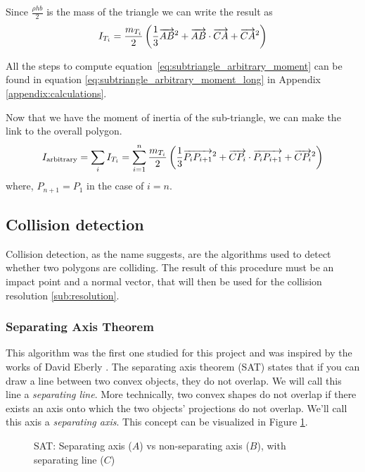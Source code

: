 Since $\frac{\rho h b}{2}$ is the mass of the triangle we can write the result
as
\begin{equation}
	I_{T_i} = \frac{m_{T_i}}{2} \left(\frac{1}{3} \overrightarrow{AB}^2 + \overrightarrow{AB} \cdot \overrightarrow{CA}
	+ \overrightarrow{CA}^2\right)
\end{equation}


All the steps to compute equation~\ref{eq:subtriangle_arbitrary_moment} can be
found in equation \ref{eq:subtriangle_arbitrary_moment_long} in Appendix
\ref{appendix:calculations}.

Now that we have the moment of inertia of the sub-triangle, we can make the link
to the overall polygon.
\begin{equation}
	I_{\text{arbitrary}} = \sum_i I_{T_i} = \sum_{i=1}^n \frac{m_{T_i}}{2}
	\left(\frac{1}{3} \overrightarrow{P_iP_{i+1}}^2 + \overrightarrow{CP_i} \cdot \overrightarrow{P_iP_{i+1}} +
	\overrightarrow{CP_i}^2\right)
\end{equation}
where, $P_{n+1} = P_1$ in the case of $i = n$.

\subsection{Collision detection}
\label{sub:collision-detection}

Collision detection, as the name suggests, are the algorithms used to detect
whether two polygons are colliding. The result of this procedure must be an
impact point and a normal vector, that will then be used for the  collision
resolution \ref{sub:resolution}.

\subsubsection{Separating Axis Theorem}

This algorithm was the first one studied for this project and was inspired by
the works of David Eberly \cite{convexcollisionsSAT}. The separating axis
theorem (SAT) states that if you can draw a line between two convex objects,
they do not overlap. We will call this line a \textit{separating line}. More
technically, two convex shapes do not overlap if there exists an axis onto which
the two objects' projections do not overlap. We'll call this axis a \textit{separating
	axis}. This concept can be visualized in Figure \ref{fig:SAT-intro}.

\begin{figure}[H]
	\centering
	\caption{SAT: Separating axis ($A$) vs non-separating axis ($B$), with
		separating line ($C$)}
	\label{fig:SAT-intro}
\end{figure}

